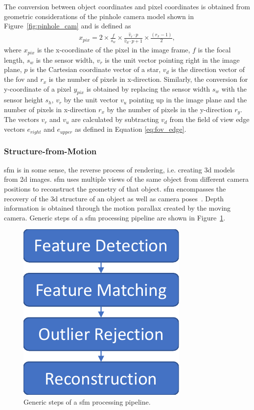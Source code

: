 The conversion between object coordinates and pixel coordinates is obtained from geometric considerations of the pinhole camera model shown in Figure~\ref{fig:pinhole_cam} and is defined as
\begin{align}
    x_{pix} = 2 \times \frac{f}{s_w} \times \frac{\hat{v}_r \cdot p}{\hat{v}_d \cdot p + 1} \times \frac{(r_x - 1)}{2}, \label{eq:pix_conversion} 
\end{align}
where $x_{pix}$ is the x-coordinate of the pixel in the image frame, $f$ is the focal length, $s_w$ is the sensor width, $v_r$ is the unit vector pointing right in the image plane, $p$ is the Cartesian coordinate vector of a star, $v_d$ is the direction vector of the \gls{fov} and $r_x$ is the number of pixels in x-direction. Similarly, the conversion for y-coordinate of a pixel $y_{pix}$ is obtained by replacing the sensor width $s_w$ with the sensor height $s_h$, $v_r$ by the unit vector $v_u$ pointing up in the image plane and the number of pixels in x-direction $r_x$ by the number of pixels in the y-direction $r_y$. The vectors $v_r$ and $v_u$ are calculated by subtracting $v_d$ from the field of view edge vectors $e_{right}$ and $e_{upper}$ as defined in Equation \ref{eq:fov_edge}.

\subsubsection{Structure-from-Motion}
\Gls{sfm} is in some sense, the reverse process of rendering, i.e. creating \gls{3d} models from \gls{2d} images. \gls{sfm} uses multiple views of the same object from different camera positions to reconstruct the geometry of that object. \Gls{sfm} encompasses the recovery of the \gls{3d} structure of an object as well as camera poses~\cite{szeliski2010computer}. Depth information is obtained through the motion parallax created by the moving camera. Generic steps of a \gls{sfm} processing pipeline are shown in Figure~\ref{fig:sfm_steps}.

\begin{figure}[htb]
    \centering
    \includegraphics[width=.25\textwidth]{doc/thesis/0_figures/sfm/SfM.pdf}
    \caption{Generic steps of a \gls{sfm} processing pipeline.}
    \label{fig:sfm_steps}
\end{figure}

